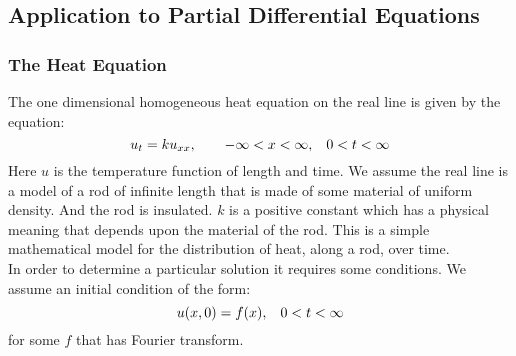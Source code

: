 \documentclass[aima331_lecturenotes_ku.tex]{subfiles}
\begin{document}
 \subsection{Application to Partial Differential Equations}
 \subsubsection{The Heat Equation}
 The one dimensional homogeneous heat equation on the real line is given by the equation:
 \begin{equation}
   \label{heat}
   u_t =ku_{xx}, \hspace{7mm} -\infty < x < \infty, \hspace{3mm} 0 <t < \infty
 \end{equation}
 Here $u$ is the temperature function of length and time. We assume the real line is a model of a rod of infinite length that is made of some material of uniform density. And the rod is insulated. $k$ is a positive constant which has a physical meaning that depends upon the material of the rod. This is a simple mathematical model for the distribution of heat, along a rod, over time. \\[2mm]
 In order to determine a particular solution it requires some conditions. We assume an initial condition of the form:
 $$u(x,0) = f(x), \hspace{3mm}  0 <t < \infty $$ for some $f$ that has Fourier transform.
\end{document}
